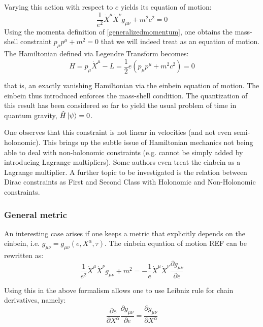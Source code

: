 \documentclass[twoside,a4paper,11pt]{article}
\numberwithin{equation}{section}
\begin{document}
Varying this action with respect to $e$ yields its equation of motion:
\begin{equation}
    \frac{1}{e^2} \dot{X}^{\mu}\dot{X}^{\nu}g_{\mu \nu} + m^2 c^2 =0
    \label{alleom}
\end{equation}
Using the momenta definition of \ref{generalizedmomentum}, one obtains the mass-shell constraint $p_\mu p^\mu + m^2 = 0$ that we will indeed treat as an equation of motion. The Hamiltonian defined via Legendre Transform becomes:
\begin{equation}
    H = p_\mu \dot{X}^\mu - L = \frac{1}{2}e(p_\mu p^\mu + m^2 c^2) = 0
    \label{simpleHamiltonian}
\end{equation}

that is, an exactly vanishing Hamiltonian via the einbein equation of motion. The einbein thus introduced enforces the mass-shell condition. The quantization of this result has been considered so far to yield the usual problem of time in quantum gravity, $\hat{H} \ket{\psi} = 0$.

One observes that this constraint is not linear in velocities (and not even semi-holonomic). This brings up the subtle issue of Hamiltonian mechanics not being able to deal with non-holonomic constraints (e.g. cannot be simply added by introducing Lagrange multipliers). Some authors even treat the einbein as a Lagrange multiplier. A further topic to be investigated is the relation between Dirac constraints as First and Second Class with Holonomic and Non-Holonomic constraints.








\iffalse
\subsubsection{General metric}

An interesting case arises if one keeps a metric that explicitly depends on the einbein, i.e. $g_{\mu \nu} = g_{\mu \nu}(e, X^\alpha, \tau)$. The einbein equation of motion REF can be rewritten as:
\begin{equation}
    \frac{1}{e^2}\dot{X}^\mu \dot{X}^\nu g_{\mu \nu} + m^2 = - \frac{1}{e}\dot{X}^\mu \dot{X}^\nu \frac{\partial g_{\mu \nu}}{\partial e}
\end{equation}

Using this in the above formalism allows one to use Leibniz rule for chain derivatives, namely:
\begin{equation}
    \frac{\partial e}{\partial X^\alpha} \frac{\partial g_{\mu \nu}}{\partial e} = \frac{\partial g_{\mu \nu}}{\partial X^\alpha}
\end{equation}
\end{document}
